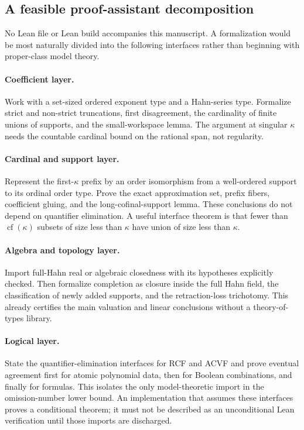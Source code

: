 \documentclass[11pt,letterpaper]{article}
\numberwithin{equation}{section}
\theoremstyle{definition}
\theoremstyle{remark}
\newcommand{\cf}{\operatorname{cf}}
\begin{document}
\subsection{A feasible proof-assistant decomposition}
No Lean file or Lean build accompanies this manuscript. A formalization would be most naturally divided into the following interfaces rather than beginning with proper-class model theory.

\paragraph{Coefficient layer.}
Work with a set-sized ordered exponent type and a Hahn-series type. Formalize strict and non-strict truncations, first disagreement, the cardinality of finite unions of supports, and the small-workspace lemma. The argument at singular $\kappa$ needs the countable cardinal bound on the rational span, not regularity.

\paragraph{Cardinal and support layer.}
Represent the first-$\kappa$ prefix by an order isomorphism from a well-ordered support to its ordinal order type. Prove the exact approximation set, prefix fibers, coefficient gluing, and the long-cofinal-support lemma. These conclusions do not depend on quantifier elimination. A useful interface theorem is that fewer than $\cf(\kappa)$ subsets of size less than $\kappa$ have union of size less than $\kappa$.

\paragraph{Algebra and topology layer.}
Import full-Hahn real or algebraic closedness with its hypotheses explicitly checked. Then formalize completion as closure inside the full Hahn field, the classification of newly added supports, and the retraction-loss trichotomy. This already certifies the main valuation and linear conclusions without a theory-of-types library.

\paragraph{Logical layer.}
State the quantifier-elimination interfaces for RCF and ACVF and prove eventual agreement first for atomic polynomial data, then for Boolean combinations, and finally for formulas. This isolates the only model-theoretic import in the omission-number lower bound. An implementation that assumes these interfaces proves a conditional theorem; it must not be described as an unconditional Lean verification until those imports are discharged.
\end{document}
